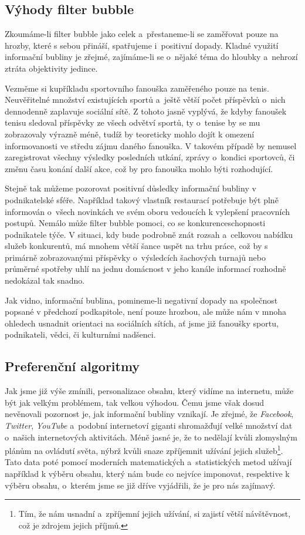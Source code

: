 \documentclass[12pt, a4paper]{article}
\numberwithin{equation}{section} 	%
\begin{document}
\subsection{Výhody filter bubble}
\noindent Zkoumáme-li filter bubble jako celek a~přestaneme-li se zaměřovat pouze na hrozby, které s sebou přináší, spatřujeme i~positivní dopady. Kladné využití informační bubliny je zřejmé, zajímáme-li se o~nějaké téma do hloubky a~nehrozí ztráta objektivity jedince.

Vezměme si kupříkladu sportovního fanouška zaměřeného pouze na tenis. Neuvěřitelné množství existujících sportů a~ještě větší počet příspěvků o~nich dennodenně zaplavuje sociální sítě. Z tohoto jasně vyplývá, že kdyby fanoušek tenisu sledoval příspěvky ze všech odvětví sportů, ty o~tenise by se mu zobrazovaly výrazně méně, tudíž by teoreticky mohlo dojít k omezení informovanosti ve středu zájmu daného fanouška. V takovém případě by nemusel zaregistrovat všechny výsledky posledních utkání, zprávy o~kondici sportovců, či změnu času konání další akce, což by pro fanouška mohlo býti rozhodující.

Stejně tak můžeme pozorovat positivní důsledky informační bubliny v podnikatelské sféře. Například takový vlastník restaurací potřebuje být plně informován o~všech novinkách ve svém oboru vedoucích k vylepšení pracovních postupů. Nemálo může filter bubble pomoci, co se konkurenceschopnosti podnikatele týče. V situaci, kdy bude podrobně znát rozsah a~celkovou nabídku služeb konkurentů, má mnohem větší šance uspět na trhu práce, což by s primárně zobrazovanými příspěvky o~výsledcích šachových turnajů nebo průměrné spotřeby uhlí na jednu domácnost v jeho kanále informací rozhodně nedokázal tak snadno.

Jak vidno, informační bublina, pomineme-li negativní dopady na společnost popsané v předchozí podkapitole, není pouze hrozbou, ale může nám v mnoha ohledech usnadnit orientaci na sociálních sítích, ať jsme již fanoušky sportu, podnikateli, vědci, či kulturními nadšenci.

\subsection{Preferenční algoritmy}
\noindent Jak jsme již výše zmínili, personalizace obsahu, který vidíme na internetu, může být jak velkým problémem, tak velkou výhodou. Čemu jsme však dosud nevěnovali pozornost je, jak informační bubliny vznikají. Je zřejmé, že \textit{Facebook}, \textit{Twitter}, \textit{YouTube} a~podobní internetoví giganti shromažďují velké množství dat o~našich internetových aktivitách. Méně jasné je, že to nedělají kvůli zlomyslným plánům na ovládutí světa, nýbrž kvůli snaze zpříjemnit užívání jejich služeb\footnote{Tím, že nám usnadní a~zpříjemní jejich užívání, si zajistí větší návštěvnost, což je zdrojem jejich příjmů.}. Tato data poté pomocí moderních matematických a~statistických metod užívají například k výběru obsahu, který nám bude co nejvíce imponovat, respektive k výběru obsahu, o~kterém jsme se již dříve vyjádřili, že je pro nás zajímavý.
\end{document}
